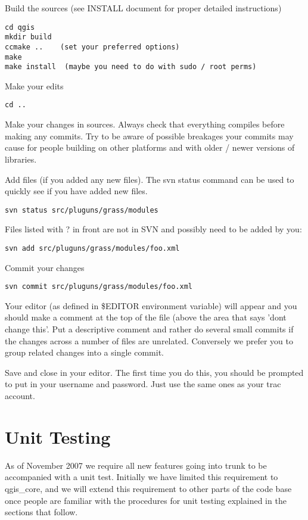 Build the sources (see INSTALL document for proper detailed instructions)

\begin{verbatim}
cd qgis
mkdir build
ccmake ..    (set your preferred options)
make
make install  (maybe you need to do with sudo / root perms)
\end{verbatim}

Make your edits

\begin{verbatim}
cd ..
\end{verbatim}

Make your changes in sources. Always check that everything compiles before making any commits.
Try to be aware of possible breakages your commits may cause for people building on other 
platforms and with older / newer versions of libraries.

Add files (if you added any new files). The svn status command can be used to quickly see 
if you have added new files.

\begin{verbatim}
svn status src/pluguns/grass/modules
\end{verbatim}

Files listed with ? in front are not in SVN and possibly need to be added by you:

\begin{verbatim}
svn add src/pluguns/grass/modules/foo.xml
\end{verbatim}

Commit your changes

\begin{verbatim}
svn commit src/pluguns/grass/modules/foo.xml
\end{verbatim}

Your editor (as defined in \$EDITOR environment variable) will appear and you should make a
 comment at the top of the file (above the area that says 'dont change this'. Put a 
descriptive comment and rather do several small commits if the changes across a number of 
files are unrelated. Conversely we prefer you to group related changes into a single commit.

Save and close in your editor. The first time you do this, you should be prompted to 
put in your username and password. Just use the same ones as your trac account.


\section{Unit Testing}
As of November 2007 we require all new features going into trunk to be accompanied with 
a unit test. Initially we have limited this requirement to qgis\_core, and we will extend 
this requirement to other parts of the code base once people are familiar with the 
procedures for unit testing explained in the sections that follow.

